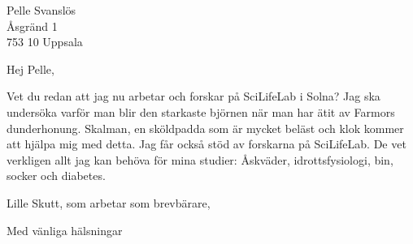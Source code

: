 \documentclass[version=last, scilifelabletter]{scrlttr2}
\begin{document}
%
\begin{letter}{%
		Pelle Svanslös\\
		Åsgränd 1\\ 
		753 10 Uppsala
	}
	\opening{Hej Pelle,}

	Vet du redan att jag nu arbetar och forskar på SciLifeLab i Solna? Jag ska undersöka varför man blir den starkaste björnen när man har ätit av Farmors dunderhonung. Skalman, en sköldpadda som är mycket beläst och klok kommer att hjälpa mig med detta. Jag får också stöd av forskarna på SciLifeLab. De vet verkligen allt jag kan behöva för mina studier: Åskväder, idrottsfysiologi, bin, socker och diabetes.  

	Lille Skutt, som arbetar som brevbärare, 

	\closing{Med vänliga hälsningar}
\end{letter}
%
\end{document}
